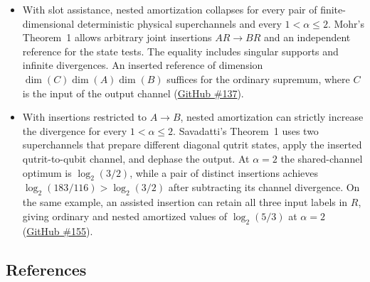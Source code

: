 \begin{itemize}
  \item With slot assistance, nested amortization collapses for every pair of
finite-dimensional deterministic physical superchannels and every
$1<\alpha\leq2$. Mohr's Theorem~1 allows arbitrary joint insertions
$AR\to BR$ and an independent reference for the state tests. The equality
includes singular supports and infinite divergences. An inserted
reference of dimension $\dim(C)\dim(A)\dim(B)$ suffices for the ordinary
supremum, where $C$ is the input of the output channel
(\href{https://github.com/Naixu-Guo/quantum-open-problems/issues/137}{GitHub \#137}).

  \item With insertions restricted to $A\to B$, nested amortization can
strictly increase the divergence for every $1<\alpha\leq2$.
Savadatti's Theorem~1 uses two superchannels that prepare different
diagonal qutrit states, apply the inserted qutrit-to-qubit channel,
and dephase the output. At $\alpha=2$ the shared-channel optimum is
$\log_2(3/2)$, while a pair of distinct insertions achieves
$\log_2(183/116)>\log_2(3/2)$ after subtracting its channel divergence.
On the same example, an assisted insertion can retain all three input
labels in $R$, giving ordinary and nested amortized values of
$\log_2(5/3)$ at $\alpha=2$
(\href{https://github.com/Naixu-Guo/quantum-open-problems/issues/155}{GitHub \#155}).
\end{itemize}

\subsection*{References}

